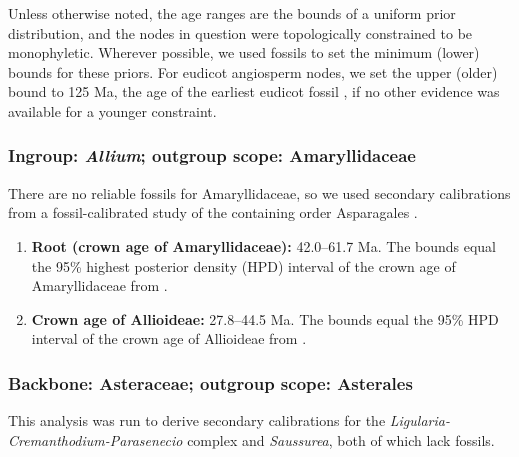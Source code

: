 Unless otherwise noted, the age ranges are the bounds of a uniform
prior distribution, and the nodes in question were topologically
constrained to be monophyletic. Wherever possible, we used fossils to
set the minimum (lower) bounds for these priors. For eudicot
angiosperm nodes, we set the upper (older) bound to 125 Ma, the age of
the earliest eudicot fossil \citep{Hughes1994}, if no other evidence
was available for a younger constraint.

\subsubsection*{Ingroup: \textit{Allium}; outgroup scope:
  Amaryllidaceae}



\noindent There are no reliable fossils for Amaryllidaceae, so we used
secondary calibrations from a fossil-calibrated study of the
containing order Asparagales \citep{Chen2013}.

\begin{enumerate}

\item \textbf{Root (crown age of Amaryllidaceae):} 42.0--61.7 Ma. The
  bounds equal the 95\% highest posterior density (HPD) interval of
  the crown age of Amaryllidaceae from \cite{Chen2013}.

\item \textbf{Crown age of Allioideae:} 27.8--44.5 Ma. The bounds
  equal the 95\% HPD interval of the crown age of Allioideae from
  \cite{Chen2013}.

\end{enumerate}

\subsubsection*{Backbone: Asteraceae; outgroup scope: Asterales}

This analysis was run to derive secondary calibrations for the
\textit{Ligularia-Cremanthodium-Parasenecio} complex and
\textit{Saussurea}, both of which lack fossils.%

